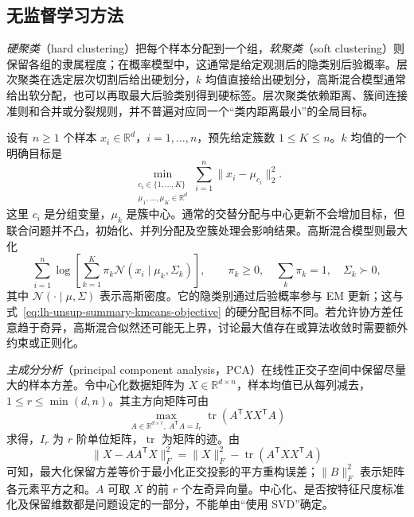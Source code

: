 \subsection{无监督学习方法}
\label{subsec:lh-unsup-task-methods}

\emph{硬聚类}（hard clustering）把每个样本分配到一个组，\emph{软聚类}（soft clustering）则保留各组的隶属程度；在概率模型中，这通常是给定观测后的隐类别后验概率。层次聚类在选定层次切割后给出硬划分，$k$ 均值直接给出硬划分，高斯混合模型通常给出软分配，也可以再取最大后验类别得到硬标签。层次聚类依赖距离、簇间连接准则和合并或分裂规则，并不普遍对应同一个“类内距离最小”的全局目标。

设有 $n\geq1$ 个样本 $x_i\in\mathbb R^d$，$i=1,\ldots,n$，预先给定簇数 $1\leq K\leq n$。$k$ 均值的一个明确目标是
\begin{equation}
\label{eq:lh-unsup-summary-kmeans-objective}
    \min_{\substack{c_i\in\{1,\ldots,K\}\\ \mu_1,\ldots,\mu_K\in\mathbb R^d}}
    \sum_{i=1}^{n}\|x_i-\mu_{c_i}\|_2^2.
\end{equation}
这里 $c_i$ 是分组变量，$\mu_k$ 是簇中心。通常的交替分配与中心更新不会增加目标，但联合问题并不凸，初始化、并列分配及空簇处理会影响结果。高斯混合模型则最大化
\[
    \sum_{i=1}^{n}\log\left[\sum_{k=1}^{K}
    \pi_k\mathcal N(x_i\mid\mu_k,\Sigma_k)\right],
    \qquad \pi_k\geq0,\quad\sum_k\pi_k=1,\quad\Sigma_k\succ0,
\]
其中 $\mathcal N(\cdot\mid\mu,\Sigma)$ 表示高斯密度。它的隐类别通过后验概率参与 EM 更新；这与式~\eqref{eq:lh-unsup-summary-kmeans-objective} 的硬分配目标不同。若允许协方差任意趋于奇异，高斯混合似然还可能无上界，讨论最大值存在或算法收敛时需要额外约束或正则化。

\emph{主成分分析}（principal component analysis，PCA）在线性正交子空间中保留尽量大的样本方差。令中心化数据矩阵为 $X\in\mathbb R^{d\times n}$，样本均值已从每列减去，$1\leq r\leq\min(d,n)$。其主方向矩阵可由
\begin{equation}
\label{eq:lh-unsup-pca-objective}
    \max_{A\in\mathbb R^{d\times r},\ A^{\mathsf T}A=I_r}
    \operatorname{tr}(A^{\mathsf T}XX^{\mathsf T}A)
\end{equation}
求得，$I_r$ 为 $r$ 阶单位矩阵，$\operatorname{tr}$ 为矩阵的迹。由
\[
    \|X-AA^{\mathsf T}X\|_F^2
    =\|X\|_F^2-\operatorname{tr}(A^{\mathsf T}XX^{\mathsf T}A)
\]
可知，最大化保留方差等价于最小化正交投影的平方重构误差；$\|B\|_F^2$ 表示矩阵各元素平方之和。$A$ 可取 $X$ 的前 $r$ 个左奇异向量。中心化、是否按特征尺度标准化及保留维数都是问题设定的一部分，不能单由“使用 SVD”确定。

